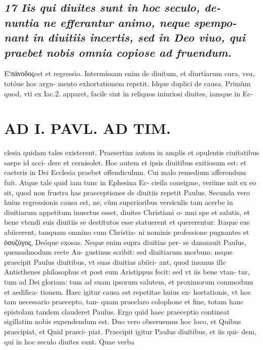 \documentclass{article}
\begin{document}
\begin{pages}
\subsection*{\textit{17 Iis qui diuites sunt in hoc seculo, de- nuntia ne efferantur animo, neque spempo- nant in diuitiis incertis, sed in Deo viuo, qui praebet nobis omnia copiose ad fruendum. }}\pstart Εʹπάνοδοςest et regressio. Intermissam enim de diuitum, et diurtiarum cura, vsu, totóue hoc argu- mento exhortationem repetit. Idque duplici de causa. Primùm quod, vti ex Iac.2. apparet, facile sint in reliquos iniuriosi diuites, iamque in Ec-  \pend
\section*{AD I. PAVL. AD TIM. }
\marginpar{[ p.494 ]}\pstart clesia quidam tales existerent. Praesertim autem in amplis et opulentis ciuitatibus saepe id acci- dere et cernisolet. Hoc autem et ipsis diuitibus exitiosum est: et caeteris in Dei Ecclesia praebet offendiculum. Cui malo remedium afferendum fuit. Atque tale quid iam tunc in Ephesina Ec- cieila coneigme, veriime mit ex eo sit, quod non frustra has praeceptiones de diuitiis repetit Paulus.  \pend\pstart Secunda vero huius regressionis causa est, ne, cùm superioribus versiculis tam acerbe in diuitiarum appetitum inuectus esset, diuites Christiani o- mni spe et salutis, et bene vtendi suis diuitiis se destitutos esse statuerent et quererentur. Itaque eas abiicerent, tanquam omnino cum Christia- ni nominis professione pugnantes et ὀσυζύγος, Deóque exosas. Neque enim supra diuitias per- se damnauit Paulus, quemadmodum recte Au- gustinus scribit: sed diuitiarum morbum: neque praecipit Paulus diuitibus, vt suas diuitias abiici- ant, quod insanus ille Antisthenes philosophus et post eum Aristippus fecit: sed vt iis bene vtan- tur, tum ad Dei gloriam: tum ad suam ipsorum salutem, et proximorum commodum et aedifica- tionem. Haec igitur causa est repetitae huius ex- hortationis, vt hoc tam necessario praecepto, tan- quam praeclaro colophone et fine, totam hanc epistolam tandem clauderet Paulus.  \pend\pstart Ergo quid haec praeceptio contineat sigillatim nobis expendendum est. Duo vero obseruemus hoc loco, et Quibus praecipiat, et Quid praeci- piat. Praecipit igitur Paulus diuitibus, et iis qui- dem, qui in hoc seculo diuites sunt. Quae verba  \pend

\end{pages}
\end{document}
